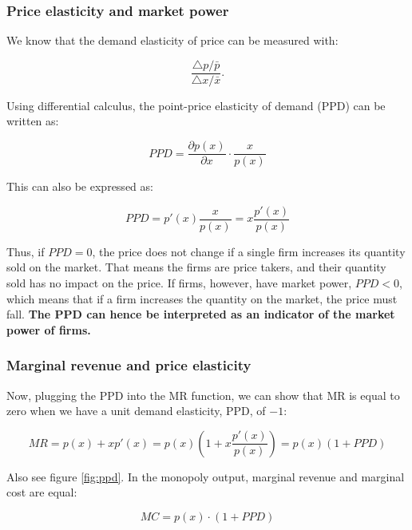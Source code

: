 \documentclass[
  12pt,
  oneside]{book}
\theoremstyle{definition}
\theoremstyle{definition}
\theoremstyle{definition}
\theoremstyle{definition}
\theoremstyle{remark}
\begin{document}
\subsubsection*{Price elasticity and market power}\label{price-elasticity-and-market-power}

We know that the demand elasticity of price can be measured with:

\[ \frac{\triangle p/\bar{p}}{\triangle x / \bar{x}}. \]

Using differential calculus, the point-price elasticity of demand (PPD) can be written as:

\[ PPD = \frac{\partial p(x)}{\partial x} \cdot \frac{x}{p(x)} \]

This can also be expressed as:

\[ PPD = p'(x) \frac{x}{p(x)} = x \frac{p'(x)}{p(x)} \]

Thus, if \(PPD = 0\), the price does not change if a single firm increases its quantity sold on the market. That means the firms are price takers, and their quantity sold has no impact on the price. If firms, however, have market power, \(PPD < 0\), which means that if a firm increases the quantity on the market, the price must fall. \textbf{The PPD can hence be interpreted as an indicator of the market power of firms.}

\subsubsection*{Marginal revenue and price elasticity}\label{marginal-revenue-and-price-elasticity}

Now, plugging the PPD into the MR function, we can show that MR is equal to zero when we have a unit demand elasticity, PPD, of \(-1\):

\[ MR = p(x) + xp'(x) = p(x)\left(1 + x\frac{p'(x)}{p(x)}\right) = p(x)\left(1 + PPD\right) \]

Also see figure \ref{fig:ppd}. In the monopoly output, marginal revenue and marginal cost are equal:

\[ MC = p(x) \cdot \left(1 + PPD\right) \]
\end{document}
